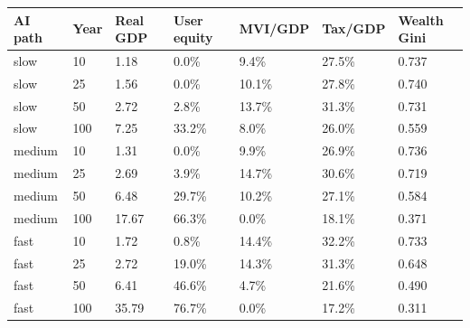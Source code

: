 \begin{tabular}{lllllll}
\toprule
AI path & Year & Real GDP & User equity & MVI/GDP & Tax/GDP & Wealth Gini \\
\midrule
slow & 10 & 1.18 & 0.0\% & 9.4\% & 27.5\% & 0.737 \\
slow & 25 & 1.56 & 0.0\% & 10.1\% & 27.8\% & 0.740 \\
slow & 50 & 2.72 & 2.8\% & 13.7\% & 31.3\% & 0.731 \\
slow & 100 & 7.25 & 33.2\% & 8.0\% & 26.0\% & 0.559 \\
medium & 10 & 1.31 & 0.0\% & 9.9\% & 26.9\% & 0.736 \\
medium & 25 & 2.69 & 3.9\% & 14.7\% & 30.6\% & 0.719 \\
medium & 50 & 6.48 & 29.7\% & 10.2\% & 27.1\% & 0.584 \\
medium & 100 & 17.67 & 66.3\% & 0.0\% & 18.1\% & 0.371 \\
fast & 10 & 1.72 & 0.8\% & 14.4\% & 32.2\% & 0.733 \\
fast & 25 & 2.72 & 19.0\% & 14.3\% & 31.3\% & 0.648 \\
fast & 50 & 6.41 & 46.6\% & 4.7\% & 21.6\% & 0.490 \\
fast & 100 & 35.79 & 76.7\% & 0.0\% & 17.2\% & 0.311 \\
\bottomrule
\end{tabular}
